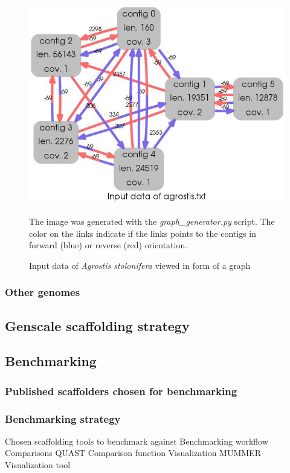 \documentclass[10pt, twocolumn]{article}
\begin{document}
\begin{figure}[h!]
\includegraphics[scale=0.4]{agrostis_INPT}
\caption{Input data of \textit{Agrostis stolonifera} viewed in form of a graph}
{\footnotesize The image was generated with the \textit{graph\_generator.py} script. The color on the links indicate if the links points to the contigs in forward (blue) or reverse (red) orientation.}

\end{figure}

\subsubsection{Other genomes}

\newpage
\subsection{Genscale scaffolding strategy}
\subsection{Benchmarking}
\subsubsection{Published scaffolders chosen for benchmarking}
\subsubsection{Benchmarking strategy}
Chosen scaffolding tools to benchmark against
Benchmarking workflow
Comparisons
QUAST
Comparison function
Visualization
MUMMER
Visualization tool
\end{document}
